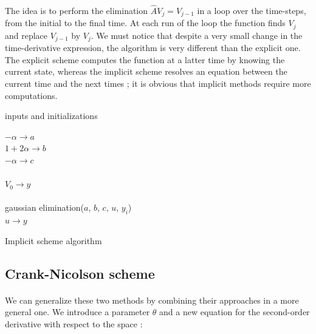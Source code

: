 \documentclass[a4paper, twoside, 11pt]{report}
\theoremstyle{theorem}
\theoremstyle{remark}
\theoremstyle{exemple}
\begin{document}
                    \paragraph{}The idea is to perform the elimination $\hat{A}V_j = V_{j-1}$ in a loop over the time-steps, from the initial to the final time. At each run of the loop the function finds $V_j$ and replace $V_{j-1}$ by $V_j$. We must notice that despite a very small change in the time-derivative expression, the algorithm is very different than the explicit one. The explicit scheme computes the function at a latter time by knowing the current state, whereas the implicit scheme resolves an equation between the current time and the next times ; it is obvious that implicit methods require more computations.

                    \begin{center}
                    \begin{algorithm}[H]

                    \SetAlgoLined
                    inputs and initializations 

                    $-\alpha \rightarrow a$\\
                    $1+2\alpha \rightarrow b$\\
                    $-\alpha \rightarrow c$\\    \\
                    $V_0 \rightarrow y$\\   
                    \ \\
                    {
                        gaussian elimination($a$, $b$, $c$, $u$, $y_i$)\\
                        $u \rightarrow y$ \\
                    }

                \caption{Implicit scheme algorithm}
                \end{algorithm}
                \end{center}


            \subsection{Crank-Nicolson scheme}

                \paragraph{}We can generalize these two methods by combining their approaches in a more general one. We introduce a parameter $\theta$ and a new equation for the second-order derivative with respect to the space :
\end{document}
